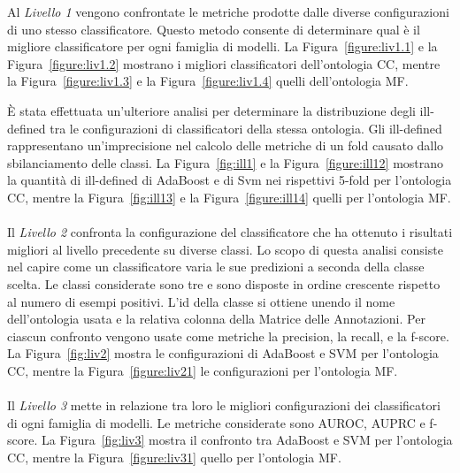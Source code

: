 \documentclass[12pt,a4paper,oneside,hidelinks]{report}
\begin{document}
Al \textit{Livello 1} vengono confrontate le metriche prodotte dalle diverse configurazioni di uno stesso classificatore. Questo metodo consente di determinare qual è il migliore classificatore per ogni famiglia di modelli. La Figura~\ref{figure:liv1.1} e la Figura~\ref{figure:liv1.2} mostrano i migliori classificatori dell'ontologia CC, mentre la Figura~\ref{figure:liv1.3} e la Figura~\ref{figure:liv1.4} quelli dell'ontologia MF. 

È stata effettuata un'ulteriore analisi per determinare la distribuzione degli ill-defined tra le configurazioni di classificatori della stessa ontologia. Gli ill-defined rappresentano un'imprecisione nel calcolo delle metriche di un fold causato dallo sbilanciamento delle classi. La Figura~\ref{fig:ill1} e la Figura~\ref{figure:ill12} mostrano la quantità di ill-defined di AdaBoost e di Svm nei rispettivi 5-fold per l'ontologia CC, mentre la Figura~\ref{fig:ill13} e la Figura~\ref{figure:ill14} quelli per l'ontologia MF.

\paragraph*{}
Il \textit{Livello 2} confronta la configurazione del classificatore che ha ottenuto i risultati migliori al livello precedente su diverse classi. Lo scopo di questa analisi consiste nel capire come un classificatore varia le sue predizioni a seconda della classe scelta. Le classi considerate sono tre e sono disposte in ordine crescente rispetto al numero di esempi positivi. L'id della classe si ottiene unendo il nome dell'ontologia usata e la relativa colonna della Matrice delle Annotazioni.
Per ciascun confronto vengono usate come metriche la precision, la recall, e la f-score.
La Figura~\ref{fig:liv2} mostra le configurazioni di AdaBoost e SVM per l'ontologia CC, mentre la Figura~\ref{figure:liv21} le configurazioni per l'ontologia MF.

\paragraph*{}
Il \textit{Livello 3} mette in relazione tra loro le migliori configurazioni dei classificatori di ogni famiglia di modelli. Le metriche considerate sono AUROC, AUPRC e f-score. La Figura~\ref{fig:liv3} mostra il confronto tra AdaBoost e SVM per l'ontologia CC, mentre la Figura~\ref{figure:liv31} quello per l'ontologia MF.

\end{document}
